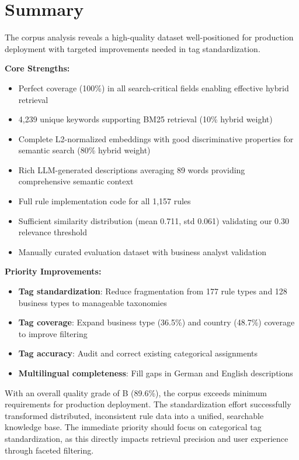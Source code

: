 \section{Summary}

The corpus analysis reveals a high-quality dataset well-positioned for production deployment with targeted improvements needed in tag standardization.

\textbf{Core Strengths:}
\begin{itemize}[leftmargin=*,itemsep=2pt,topsep=2pt]
 \item Perfect coverage (100\%) in all search-critical fields enabling effective hybrid retrieval
 \item 4,239 unique keywords supporting BM25 retrieval (10\% hybrid weight)
 \item Complete L2-normalized embeddings with good discriminative properties for semantic search (80\% hybrid weight)
 \item Rich LLM-generated descriptions averaging 89 words providing comprehensive semantic context
 \item Full rule implementation code for all 1,157 rules
 \item Sufficient similarity distribution (mean 0.711, std 0.061) validating our 0.30 relevance threshold
 \item Manually curated evaluation dataset with business analyst validation
\end{itemize}

\textbf{Priority Improvements:}
\begin{itemize}[leftmargin=*,itemsep=2pt,topsep=2pt]
 \item \textbf{Tag standardization}: Reduce fragmentation from 177 rule types and 128 business types to manageable taxonomies
 \item \textbf{Tag coverage}: Expand business type (36.5\%) and country (48.7\%) coverage to improve filtering
 \item \textbf{Tag accuracy}: Audit and correct existing categorical assignments
 \item \textbf{Multilingual completeness}: Fill gaps in German and English descriptions
\end{itemize}

With an overall quality grade of B (89.6\%), the corpus exceeds minimum requirements for production deployment. The standardization effort successfully transformed distributed, inconsistent rule data into a unified, searchable knowledge base. The immediate priority should focus on categorical tag standardization, as this directly impacts retrieval precision and user experience through faceted filtering.

